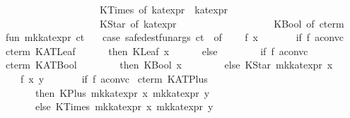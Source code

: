 \begin{isabellebody}
\ \ \ \ \ \ \ \ \ \ \ \ \ \ \ \ \ \ {}\ KTimes\ of\ kat{}expr\ {}\ kat{}expr\isanewline
\ \ \ \ \ \ \ \ \ \ \ \ \ \ \ \ \ \ {}\ KStar\ of\ kat{}expr\isanewline
\ \ \ \ \ \ \ \ \ \ \ \ \ \ \ \ \ \ {}\ KBool\ of\ cterm{}\isanewline
\isanewline
fun\ mk{}kat{}expr\ ct\ {}\isanewline
\ \ case\ safe{}dest{}funargs\ ct\ {}{}\ of\isanewline
\ \ \ \ {}f{}\ {}x{}{}\ {}{}\isanewline
\ \ \ \ \ \ if\ f\ aconvc\ %
\isaantiq
cterm\ KATLeaf{}%
\endisaantiq
\isanewline
\ \ \ \ \ \ then\ KLeaf\ x\isanewline
\ \ \ \ \ \ else\isanewline
\ \ \ \ \ \ \ \ if\ f\ aconvc\ %
\isaantiq
cterm\ KATBool{}%
\endisaantiq
\isanewline
\ \ \ \ \ \ \ \ then\ KBool\ x\isanewline
\ \ \ \ \ \ \ \ else\ KStar\ {}mk{}kat{}expr\ x{}\isanewline
\ \ {}\ {}f{}\ {}x{}\ y{}{}\ {}{}\isanewline
\ \ \ \ \ \ if\ f\ aconvc\ %
\isaantiq
cterm\ KATPlus{}%
\endisaantiq
\isanewline
\ \ \ \ \ \ then\ KPlus\ {}mk{}kat{}expr\ x{}\ mk{}kat{}expr\ y{}\isanewline
\ \ \ \ \ \ else\ KTimes\ {}mk{}kat{}expr\ x{}\ mk{}kat{}expr\ y{}\isanewline

\end{isabellebody}
